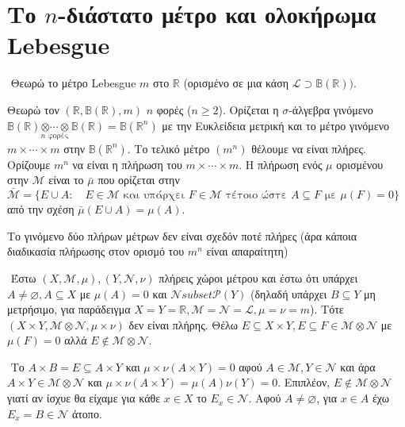 \pagebreak
\section{Το $n$-διάστατο μέτρο και ολοκήρωμα {\eng Lebesgue}}

$ $\newline
Θεωρώ το μέτρο {\eng Lebesgue} $m$ στο $\mathbb R$ (ορισμένο σε μια κάση $\mathcal L \supset \mathbb B (\mathbb{R}))$.

\begin{definition}
    Θεωρώ τον $(\mathbb{R}, \mathbb{B}(\mathbb{R}),m)$ $n$ φορές ($n \geq 2$). Ορίζεται η $\sigma$-άλγεβρα γινόμενο $ \mathbb{B}(\mathbb{R}) \underset{ n \text{ φορές }}{ \otimes \cdots \otimes} \mathbb{B}(\mathbb{R}) = \mathbb B (\mathbb{R}^n)$ με την Ευκλείδεια μετρική και το μέτρο γινόμενο $m \times \cdots \times m$ στην $\mathbb B (\mathbb{R}^n)$. Το τελικό μέτρο $(m^n)$ θέλουμε να είναι πλήρες. Ορίζουμε $m^n$ να είναι η πλήρωση του $m \times \cdots \times m$. Η πλήρωση ενός $\mu$ ορισμένου στην $\mathcal M$ είναι το $\bar{\mu}$ που ορίζεται στην $\bar{\mathcal M} = \{ E\cup A: \quad E\in \mathcal M \text{ και υπάρχει } F \in \mathcal M \text{ τέτοιο ώστε } A \subseteq F \text{ με } \mu (F) = 0 \}$ από την σχέση $\bar{\mu}(E\cup A) = \mu(A)$.
\end{definition}


\begin{remark}Το γινόμενο δύο πλήρων μέτρων δεν είναι σχεδόν ποτέ πλήρες (άρα κάποια διαδικασία πλήρωσης στον ορισμό του $m^n$ είναι απαραίτητη)
\end{remark}

$ $\newline
Έστω $(X,\mathcal M, \mu), (Y,\mathcal N, \nu)$ πλήρεις χώροι μέτρου και έστω ότι υπάρχει $A \neq \varnothing, A\subseteq X$ με $\mu(A) = 0$ και $\mathcal N subset \mathcal P (Y)$ (δηλαδή υπάρχει $B \subseteq Y$ μη μετρήσιμο, για παράδειγμα $X= Y = \mathbb{R}, \mathcal M = \mathcal N = \mathcal L, \mu = \nu = m$). Τότε $(X\times Y, \mathcal M \otimes \mathcal N, \mu \times \nu)$ δεν είναι πλήρης. Θέλω $E \subseteq X\times Y, E\subseteq F \in \mathcal M \otimes \mathcal N$ με $\mu(F) = 0$ αλλά $E \not\in \mathcal M \otimes \mathcal N$.

$ $\newline
Το $A \times B = E \subseteq A\times Y$ και $\mu \times \nu(A\times Y) = 0$ αφού $A \in \mathcal M, Y \in \mathcal N$ και άρα $A \times Y \in \mathcal M \otimes \mathcal N$ και $\mu \times \nu (A\times Y)  = \mu (A) \nu(Y) = 0$. Επιπλέον, $E \not\in \mathcal M \otimes \mathcal N$ γιατί αν ίσχυε θα είχαμε για κάθε $x \in X$ το $E_x \in \mathcal N$. Αφού $A \neq \varnothing$, για $x \in A$ έχω $E_x = B \in \mathcal N$ άτοπο.

